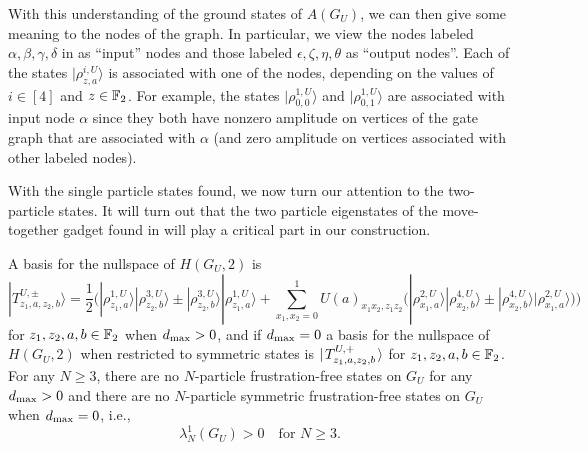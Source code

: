 \documentclass[../thesis-main/thesis-main]{subfiles}
\begin{document}
With this understanding of the ground states of $A(G_U)$, we can then give some meaning to the nodes of the graph.  In particular, we view the nodes labeled $\alpha,\beta,\gamma,\delta$ in  as ``input'' nodes and those labeled $\epsilon, \zeta,\eta,\theta$ as ``output nodes''. Each of the states $|\rho_{z,a}^{i,U}\rangle$ is associated with one of the nodes, depending on the values of $i\in[4]$ and $z\in\mathbb{F}_2$. For example, the states $|\rho_{0,0}^{1,U}\rangle$ and $|\rho_{0,1}^{1,U}\rangle$ are associated with input node $\alpha$ since they both have nonzero amplitude on vertices of the gate graph that are associated with $\alpha$ (and zero amplitude on vertices associated with other labeled nodes).

With the single particle states found, we now turn our attention to the two-particle states.  It will turn out that the two particle eigenstates of the move-together gadget found in  will play a critical part in our construction.


\begin{lemma}
 A basis for the nullspace of $H(G_U,2)$ is
\begin{equation}
  |T_{z_{1},a,z_{2},b}^{U,\pm}\rangle
    = \frac{1}{2}\Big(|\rho_{z_{1},a}^{1,U}\rangle|\rho_{z_{2},b}^{3,U}\rangle \pm |\rho_{z_{2},b}^{3,U}\rangle|\rho_{z_{1},a}^{1,U}\rangle
    +\sum_{x_1,x_2=0}^{1}U(a)_{x_{1}x_{2},z_{1}z_{2}}\big(|\rho_{x_{1},a}^{2,U}\rangle|\rho_{x_{2},b}^{4,U}\rangle \pm |\rho_{x_{2},b}^{4,U}\rangle|\rho_{x_{1},a}^{2,U}\rangle\big)\Big)\label{eq:twopartstate}
\end{equation}
for $z_{1},z_{2},a,b\in \mathbb{F}_2$ when $d_{\text{max}} >0$, and if $d_{\text{max}} = 0$ a basis for the nullspace of $H(G_U,2)$ when restricted to symmetric states is $|\mspace{2mu} T_{z_1,a,z_2,b}^{U,+} \mspace{2mu} \rangle$ for $z_1,z_2,a,b\in\mathbb{F}_2$. For any $N\geq 3$, there are no $N$-particle frustration-free
states on $G_U$  for any $d_{\text{max}} >0$ and there are no $N$-particle symmetric frustration-free  states on $G_U$ when $d_{\text{max}} = 0$, i.e., 
\begin{equation}
  \lambda_{N}^{1}(G_U)>0\quad\text{for }N\geq3.
\end{equation}
\end{lemma}
\end{document}
